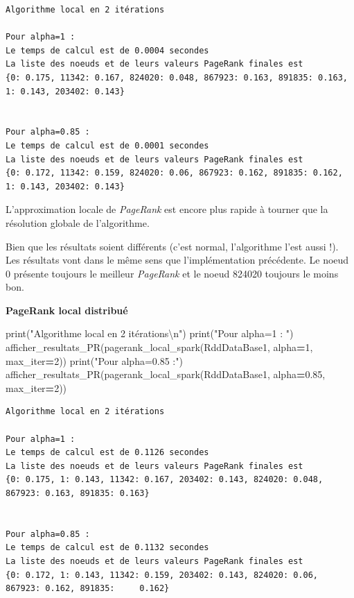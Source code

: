 \documentclass[10pt,a4paper]{article}
\newenvironment{Shaded}{\begin{snugshade}}{\end{snugshade}}
\newcommand{\BuiltInTok}[1]{#1}
\newcommand{\CharTok}[1]{\textcolor[rgb]{0.31,0.60,0.02}{#1}}
\newcommand{\DecValTok}[1]{\textcolor[rgb]{0.00,0.00,0.81}{#1}}
\newcommand{\FloatTok}[1]{\textcolor[rgb]{0.00,0.00,0.81}{#1}}
\newcommand{\NormalTok}[1]{#1}
\newcommand{\OperatorTok}[1]{\textcolor[rgb]{0.81,0.36,0.00}{\textbf{#1}}}
\newcommand{\StringTok}[1]{\textcolor[rgb]{0.31,0.60,0.02}{#1}}
\theoremstyle{break}
\begin{document}
\begin{verbatim}
Algorithme local en 2 itérations

Pour alpha=1 : 
Le temps de calcul est de 0.0004 secondes
La liste des noeuds et de leurs valeurs PageRank finales est
{0: 0.175, 11342: 0.167, 824020: 0.048, 867923: 0.163, 891835: 0.163, 1: 0.143, 203402: 0.143}


Pour alpha=0.85 :
Le temps de calcul est de 0.0001 secondes
La liste des noeuds et de leurs valeurs PageRank finales est
{0: 0.172, 11342: 0.159, 824020: 0.06, 867923: 0.162, 891835: 0.162, 1: 0.143, 203402: 0.143}
\end{verbatim}

L'approximation locale de \emph{PageRank} est encore plus rapide à tourner que la résolution globale de l'algorithme.

Bien que les résultats soient différents (c'est normal, l'algorithme l'est aussi !). Les résultats vont dans le même sens que l'implémentation précédente. Le noeud 0 présente toujours le meilleur \emph{PageRank} et le noeud 824020 toujours le moins bon.

\textbf{PageRank local distribué}

\begin{Shaded}
\begin{Highlighting}[]
\BuiltInTok{print}\NormalTok{(}\StringTok{"Algorithme local en 2 itérations}\CharTok{\textbackslash{}n}\StringTok{"}\NormalTok{)}
\BuiltInTok{print}\NormalTok{(}\StringTok{"Pour alpha=1 : "}\NormalTok{)}
\NormalTok{afficher_resultats_PR(pagerank_local_spark(RddDataBase1, alpha}\OperatorTok{=}\DecValTok{1}\NormalTok{, max_iter}\OperatorTok{=}\DecValTok{2}\NormalTok{))}
\BuiltInTok{print}\NormalTok{(}\StringTok{"Pour alpha=0.85 :"}\NormalTok{)}
\NormalTok{afficher_resultats_PR(pagerank_local_spark(RddDataBase1, alpha}\OperatorTok{=}\FloatTok{0.85}\NormalTok{, max_iter}\OperatorTok{=}\DecValTok{2}\NormalTok{)) }
\end{Highlighting}
\end{Shaded}

\begin{verbatim}
Algorithme local en 2 itérations

Pour alpha=1 : 
Le temps de calcul est de 0.1126 secondes
La liste des noeuds et de leurs valeurs PageRank finales est
{0: 0.175, 1: 0.143, 11342: 0.167, 203402: 0.143, 824020: 0.048, 867923: 0.163, 891835: 0.163}


Pour alpha=0.85 :
Le temps de calcul est de 0.1132 secondes
La liste des noeuds et de leurs valeurs PageRank finales est
{0: 0.172, 1: 0.143, 11342: 0.159, 203402: 0.143, 824020: 0.06, 867923: 0.162, 891835:     0.162}
\end{verbatim}
\end{document}
